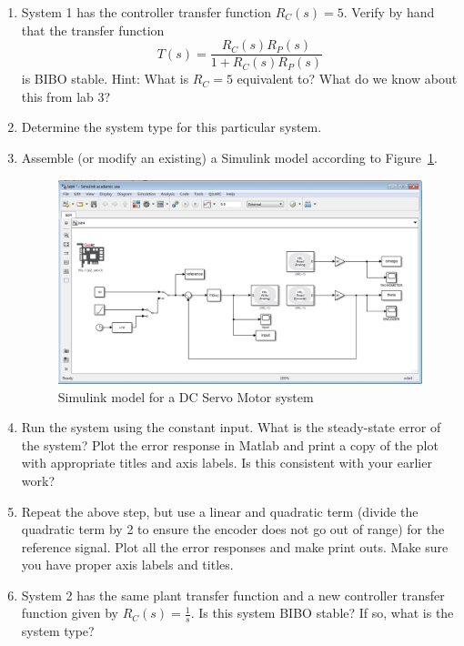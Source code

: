 \begin{enumerate}
    \item System 1 has the controller transfer function \(R_{C}(s)=5\).
          Verify by hand that the transfer function
          \begin{equation*}
              T(s)= \frac{R_{C}(s)R_{P}(s)}{1+R_{C}(s)R_{P}(s)}
          \end{equation*}
          is BIBO stable. Hint: What is \(R_{C} = 5 \) equivalent to? What do we know about this from lab 3?

    \item Determine the system type for this particular system.

    \item Assemble (or modify an existing) a \textsf{Simulink} model according to
          Figure~\ref{fig:model7a}\@.
          \begin{figure}[htbp]
              \centering
              \includegraphics[width=0.6\hsize]{pix/performanceSpecificationModel4.jpg}
              \caption{\textsf{Simulink} model for a DC Servo Motor
                  system}\label{fig:model7a}
          \end{figure}%

    \item Run the system using the constant input.  What is the steady-state
          error of the system?  Plot the error response in \textsf{Matlab} and print a
          copy of the plot with appropriate titles and axis labels. Is this consistent
          with your earlier work?

    \item Repeat the above step, but use a linear and quadratic term (divide the quadratic term by 2 to ensure the encoder does not go out of range) for the
          reference signal.  Plot all the error responses and make print outs.  Make
          sure you have proper axis labels and titles.

    \item System 2 has the same plant transfer function and a new
          controller transfer function given by \(R_{C}(s)=\frac{1}{s}\).  Is this
          system BIBO stable?  If so, what is the system type?


\end{enumerate}
